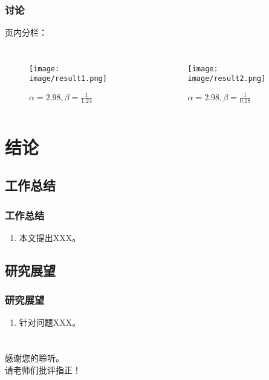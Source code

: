 \documentclass[AutoFakeBold,AutoFakeSlant]{beamer}
\begin{document}
\begin{frame}
  \frametitle{讨论}
  页内分栏：
  \begin{columns}

  \begin{figure}
    \texttt{[image: image/result1.png]}
    \caption{$\alpha=2.98, \beta=\frac{1}{1.24}$}
    \label{fig1}
  \end{figure}
  
  
  \begin{figure}
    \texttt{[image: image/result2.png]}
    \caption{$\alpha=2.98, \beta=\frac{1}{0.18}$}
    \label{fig2}
  \end{figure}
  
  \end{columns}

\end{frame}

\section{结论}

\subsection{工作总结}
\begin{frame}
  \frametitle{工作总结}

  \begin{enumerate}
    \item 本文提出XXX。
  \end{enumerate}
\end{frame}

\subsection{研究展望}
\begin{frame}
  \frametitle{研究展望}

  \begin{enumerate}
    \item 针对问题XXX。
  \end{enumerate}
\end{frame}

\section{}
\begin{frame}[plain]
  
    \LARGE{
    感谢您的聆听。\\
    请老师们批评指正！}
  
\end{frame}
\end{document}
